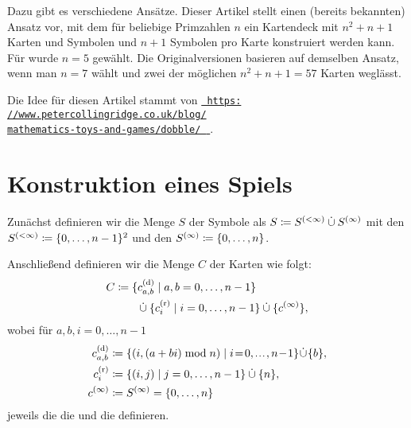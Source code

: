\documentclass[paper=81mm:81mm,fontsize=10.7pt]{scrartcl}
\begin{document}
Dazu gibt es verschiedene Ansätze.
Dieser Artikel stellt einen (bereits bekannten) Ansatz vor, mit dem für beliebige Primzahlen $n$
ein Kartendeck mit $n^2 + n + 1$ Karten und Symbolen und $n + 1$ Symbolen pro Karte konstruiert
werden kann.
Für \theda{} wurde $n = 5$ gewählt.
Die Originalversionen basieren auf demselben Ansatz, wenn man $n = 7$ wählt und
zwei der möglichen $n^2 + n + 1 = 57$ Karten weglässt.

\pagebreak

Die Idee für diesen Artikel stammt von
\href{%
  https://www.petercollingridge.co.uk/blog/mathematics-toys-and-games/dobble/%
}{%
  \texttt{%
    https:\\%
    //www.petercollingridge.co.uk/blog/\\%
    mathematics-toys-and-games/dobble/%
  }%
}.

\section*{Konstruktion eines Spiels}

Zunächst definieren wir die Menge $S$ der Symbole als $S \coloneqq S^{(<\infty)} \mathbin{\dot{\cup}} S^{(\infty)}$ mit
den  $S^{(<\infty)} \coloneqq \{0, \dotsc, n - 1\}^2$ und
den  $S^{(\infty)} \coloneqq \{0, \dotsc, n\}$.

Anschließend definieren wir die Menge $C$ der Karten wie folgt:
\begin{align*}
  C &\coloneqq \{c^\mathrm{(d)}_{a,b} \mid a, b = 0, \dotsc, n - 1\}\\
  &{} \qquad\mathbin{\dot{\cup}} \{c^\mathrm{(r)}_i \mid i = 0, \dotsc, n - 1\} \mathbin{\dot{\cup}} \{c^{(\infty)}\},
\end{align*}
wobei für $a, b, i = 0, \dotsc, n - 1$
\begin{align*}
  c^\mathrm{(d)}_{a,b}
  &\ceq
  \{
    (i, (a + bi) \bmod n) \mid i \!=\! 0, \scalebox{0.74}[1]{$\dotsc$}, n \!-\! 1
  \}
  \!\dcup\! \{b\},\\
  c^\mathrm{(r)}_i &\ceq \{(i, j) \mid j = 0, \dotsc, n - 1\} \dcup \{n\},\\
  c^{(\infty)} &\ceq S^{(\infty)} = \{0, \dotsc, n\}
\end{align*}
jeweils die  die  und die  definieren.
\end{document}
